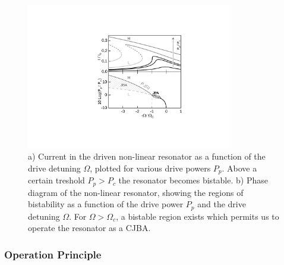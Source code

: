 \begin{figure}	
	\includegraphics[width=9cm]{"./material/figures/introduction/jba_phasediagram"}
	\caption{a) Current in the driven non-linear resonator as a function of the drive detuning $\Omega$, plotted for various drive powers $P_p$. Above a certain treshold $P_p>P_c$ the resonator becomes bistable. b) Phase diagram of the non-linear resonator, showing the regions of bistability as a function of the drive power $P_p$ and the drive detuning $\Omega$. For $\Omega>\Omega_c$, a bistable region exists which permits us to operate the resonator as a CJBA.}
	\label{fig:jba_curves}
\end{figure}

\subsubsection{Operation Principle} \label{section:jba_operation_principle}

